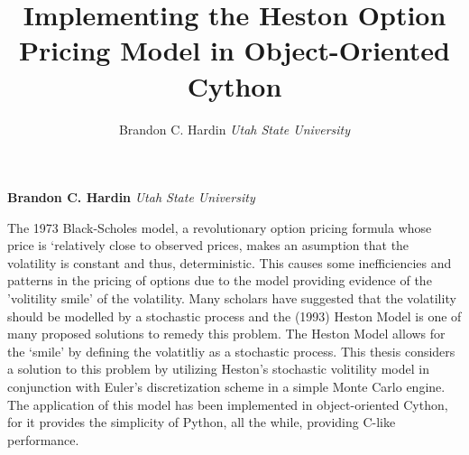 \documentclass[11pt,]{article}
\title{Implementing the Heston Option Pricing Model in Object-Oriented Cython  }
\author{\Large Brandon C. Hardin\vspace{0.05in} \newline\normalsize\emph{Utah State University}  }
\date{}
\newcommand*{\authorfont}{\fontfamily{phv}\selectfont}
\renewenvironment{abstract}
 {{%
    \setlength{\leftmargin}{0mm}
    \setlength{\rightmargin}{\leftmargin}%
  }%
  \relax}
 {\endlist}
\begin{document}
	
%

{%
\setlength{\parindent}{0pt}
\thispagestyle{plain}
{\fontsize{18}{20}\selectfont\raggedright 
\maketitle  %

}

{
   \vskip 13.5pt\relax \normalsize\fontsize{11}{12} 
\textbf{\authorfont Brandon C. Hardin} \hskip 15pt \emph{\small Utah State University}   

}

}







\begin{abstract}

    \hbox{\vrule height .2pt width 39.14pc}

    \vskip 8.5pt %

\noindent The 1973 Black-Scholes model, a revolutionary option pricing formula
whose price is `relatively close to observed prices, makes an asumption
that the volatility is constant and thus, deterministic. This causes
some inefficiencies and patterns in the pricing of options due to the
model providing evidence of the 'volitility smile' of the volatility.
Many scholars have suggested that the volatility should be modelled by a
stochastic process and the (1993) Heston Model is one of many proposed
solutions to remedy this problem. The Heston Model allows for the
`smile' by defining the volatitliy as a stochastic process. This thesis
considers a solution to this problem by utilizing Heston's stochastic
volitility model in conjunction with Euler's discretization scheme in a
simple Monte Carlo engine. The application of this model has been
implemented in object-oriented Cython, for it provides the simplicity of
Python, all the while, providing C-like performance.


    \hbox{\vrule height .2pt width 39.14pc}


\end{abstract}


\vskip 6.5pt
\end{document}
